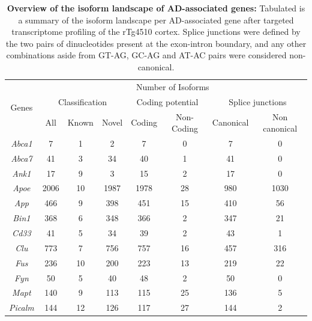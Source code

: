 \vspace{1cm}
\begin{table}[]
	\centering
	\captionsetup{width=0.95\textwidth}
	\caption[Overview of the isoform landscape of AD-associated genes]%
	{\textbf{Overview of the isoform landscape of AD-associated genes:} Tabulated is a summary of the isoform landscape per AD-associated gene after targeted transcriptome profiling of the rTg4510 cortex. Splice junctions were defined by the two pairs of dinucleotides present at the exon-intron boundary, and any other combinations aside from GT-AG, GC-AG and AT-AC pairs were considered non-canonical.}
	\label{tab: merged_targeted_num}
	\centering
	\setlength\tabcolsep{5pt} %
	\begin{tabular}{@{}cccccccc@{}}
		\toprule
		\multirow{3}{*}{Genes} & \multicolumn{7}{c}{Number of Isoforms}                                                                    \\ \cmidrule(l){2-8} 
		& \multicolumn{3}{c}{Classification} & \multicolumn{2}{c}{Coding potential} & \multicolumn{2}{c}{Splice junctions} \\ \cmidrule(l){2-8} 
		& All      & Known      & Novel      & Coding          & Non-Coding         & Canonical     & Non canonical    \\ \midrule
		\textit{Abca1}  & 7    & 1  & 2    & 7    & 0   & 7   & 0    \\
		\textit{Abca7}  & 41   & 3  & 34   & 40   & 1   & 41  & 0    \\
		\textit{Ank1}   & 17   & 9  & 3    & 15   & 2   & 17  & 0    \\
		\textit{Apoe}   & 2006 & 10 & 1987 & 1978 & 28  & 980 & 1030 \\
		\textit{App}    & 466  & 9  & 398  & 451  & 15  & 410 & 56   \\
		\textit{Bin1}   & 368  & 6  & 348  & 366  & 2   & 347 & 21   \\
		\textit{Cd33}   & 41   & 5  & 34   & 39   & 2   & 43  & 1    \\
		\textit{Clu}    & 773  & 7  & 756  & 757  & 16  & 457 & 316  \\
		\textit{Fus}    & 236  & 10 & 200  & 223  & 13  & 219 & 22   \\
		\textit{Fyn}    & 50   & 5  & 40   & 48   & 2   & 50  & 0    \\
		\textit{Mapt}   & 140  & 9  & 113  & 115  & 25  & 136 & 5    \\
		\textit{Picalm} & 144  & 12 & 126  & 117  & 27  & 144 & 2    \\

\end{tabular}
\end{table}
